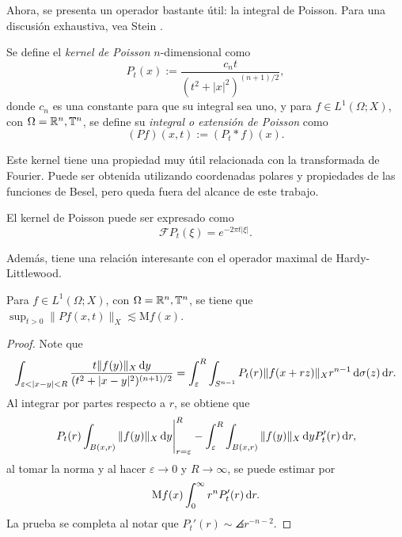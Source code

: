Ahora, se presenta un operador bastante útil: la integral de Poisson. Para una discusión exhaustiva, vea Stein \cite{stein-singular}.
\begin{definition}
	Se define el \textit{kernel de Poisson}  $n$-dimensional como 
	\begin{equation*}
		P_t(x) := \frac{c_nt}{(t^2+|x|^2)^{(n+1)/2}},
	\end{equation*}
	donde $c_n$ es una constante para que su integral sea uno, y para $f\in L^1(\Omega;X)$, con $\Omega=\mathbb{R}^n,\mathbb{T}^n$, se define su \textit{integral o extensión de Poisson} como 
	\begin{equation*}
		(Pf)(x, t) := (P_t * f)(x).
	\end{equation*}
\end{definition}
Este kernel tiene una propiedad muy útil relacionada con la transformada de Fourier. Puede ser obtenida utilizando coordenadas polares y propiedades de las funciones de Besel, pero queda fuera del alcance de este trabajo.
\begin{proposition}
	El kernel de Poisson puede ser expresado como
	\begin{equation*}
		\mathcal{F}P_t(\xi) = e^{-2\pi t|\xi|}.
	\end{equation*}
\end{proposition}
 Además, tiene una relación interesante con el operador maximal de Hardy-Littlewood.
 \begin{theorem}
 	Para $f\in L^1(\Omega;X)$, con $\Omega=\mathbb{R}^n,\mathbb{T}^n$, se tiene que $\sup_{t>0}\|Pf(x, t)\|_X \lesssim \mathrm{M}f(x)$.
 \end{theorem}
 \begin{proof}
 	Note que 
 	\begin{equation*}
 		\int_{\varepsilon<|x-y|<R} \frac{t\|f(y)\|_X\diff y}{(t^2+|x-y|^2)^{(n+1)/2}} = \int_\varepsilon^R \int_{S^{n-1}}  P_t(r)\|f(x+rz)\|_Xr^{n-1}\diff \sigma(z)\diff r.
 	\end{equation*}
 	Al integrar por partes respecto a $r$, se obtiene que 
 	\begin{equation*}
 		\left. P_t(r)\int_{B(x, r)}\|f(y)\|_X\mathop{}\!\mathrm{d} y\right\vert_{r=\varepsilon}^R - \int_\varepsilon^R \int_{B(x, r)}\|f(y)\|_X\mathop{}\!\mathrm{d} y P_t'(r) \mathop{}\!\mathrm{d} r,
 	\end{equation*} 
 	al tomar la norma y al hacer $\varepsilon\to0$ y $R\to\infty$, se puede estimar por
 	\begin{equation*}
 		\mathrm{M}f(x)\int_0^\infty r^n P_t'(r)\mathop{}\!\mathrm{d} r .
 	\end{equation*}
 	La prueba se completa al notar que $P_t'(r) \sim \angles{r}^{-n-2}$.
 \end{proof}
